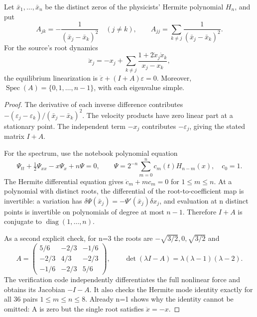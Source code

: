 \begin{proposition}\oursComputed{}
Let \(\bar x_1,\ldots,\bar x_n\) be the distinct zeros of the
physicists' Hermite polynomial \(H_n\), and put
\[
 A_{jk}=-\frac1{(\bar x_j-\bar x_k)^2}\quad(j\ne k),\qquad
 A_{jj}=\sum_{k\ne j}\frac1{(\bar x_j-\bar x_k)^2}.
\]
For the source's root dynamics
\[
 \ddot x_j=-x_j+\sum_{k\ne j}
       \frac{1+2\dot x_j\dot x_k}{x_j-x_k},
\]
the equilibrium linearization is
\(\ddot\varepsilon+(I+A)\varepsilon=0\).
Moreover, \(\operatorname{Spec}(A)=\{0,1,\ldots,n-1\}\), with
each eigenvalue simple.
\end{proposition}
\begin{proof}
The derivative of each inverse difference contributes
\(-(\varepsilon_j-\varepsilon_k)/(\bar x_j-\bar x_k)^2\).
The velocity products have zero linear part at a stationary point.
The independent term \(-x_j\) contributes \(-\varepsilon_j\),
giving the stated matrix \(I+A\).

For the spectrum, use the notebook polynomial equation
\[
 \Psi_{tt}+\tfrac12\Psi_{xx}-x\Psi_x+n\Psi=0,
 \qquad
 \Psi=2^{-n}\sum_{m=0}^n c_m(t)H_{n-m}(x),\quad c_0=1.
\]
The Hermite differential equation gives
\(\ddot c_m+mc_m=0\) for \(1\le m\le n\).
At a polynomial with distinct roots, the differential of the
root-to-coefficient map is invertible: a variation has
\(\delta\Psi(\bar x_j)=-\Psi'(\bar x_j)\delta x_j\), and
evaluation at n distinct points is invertible on polynomials of
degree at most \(n-1\). Therefore \(I+A\) is conjugate to
\(\operatorname{diag}(1,\ldots,n)\).

As a second explicit check, for n=3 the roots are
\(-\sqrt{3/2},0,\sqrt{3/2}\) and
\[
 A=\begin{pmatrix}
 5/6&-2/3&-1/6\\
 -2/3&4/3&-2/3\\
 -1/6&-2/3&5/6
 \end{pmatrix},\qquad
 \det(\lambda I-A)=\lambda(\lambda-1)(\lambda-2).
\]
The verification code independently differentiates the full nonlinear
force and obtains its Jacobian \(-I-A\). It also checks the Hermite
mode identity exactly for all 36 pairs \(1\le m\le n\le8\).
Already n=1 shows why the identity cannot be omitted: A is zero but
the single root satisfies \(\ddot x=-x\).
\end{proof}

